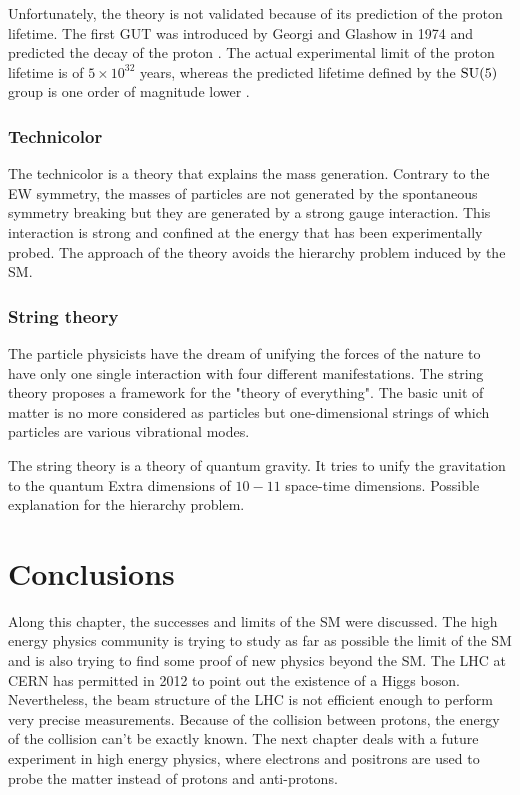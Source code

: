       Unfortunately, the theory is not validated because of its prediction of the proton lifetime. 
      The first \gls{GUT} was introduced by Georgi and Glashow in 1974 and predicted the decay of the proton \cite{Georgi:1974sy}. 
      The actual experimental limit of the proton lifetime is of $5 \times 10^{32}$ years, whereas the predicted lifetime defined by the $\rm{SU}(5)$ group is one order of magnitude lower \cite{Agashe:2014kda}.

      \subsubsection{Technicolor}

      The technicolor is a theory that explains the mass generation.
      Contrary to the \gls{EW} symmetry, the masses of particles are not generated by the spontaneous symmetry breaking but they are generated by a strong gauge interaction.
      This interaction is strong and confined at the energy that has been experimentally probed.
      The approach of the theory avoids the hierarchy problem induced by the \gls{SM}.
      
      \subsubsection{String theory}

      The particle physicists have the dream of unifying the forces of the nature to have only one single interaction with four different manifestations.
      The string theory proposes a framework for the "theory of everything".
      The basic unit of matter is no more considered as particles but one-dimensional strings of which particles are various vibrational modes.

      The string theory is a theory of quantum gravity.
      It tries to unify the gravitation to the quantum 
      Extra dimensions of $10-11$ space-time dimensions.
      Possible explanation for the hierarchy problem.

  \section{Conclusions}

  Along this chapter, the successes and limits of the \gls{SM} were discussed.
  The high energy physics community is trying to study as far as possible the limit of the \gls{SM} and is also trying to find some proof of new physics beyond the \gls{SM}.
  The \gls{LHC} at CERN has permitted in 2012 to point out the existence of a Higgs boson.  
  Nevertheless, the beam structure of the \gls{LHC} is not efficient enough to perform very precise measurements.
  Because of the collision between protons, the energy of the collision can't be exactly known.
  The next chapter deals with a future experiment in high energy physics, where electrons and positrons are used to probe the matter instead of protons and anti-protons.

